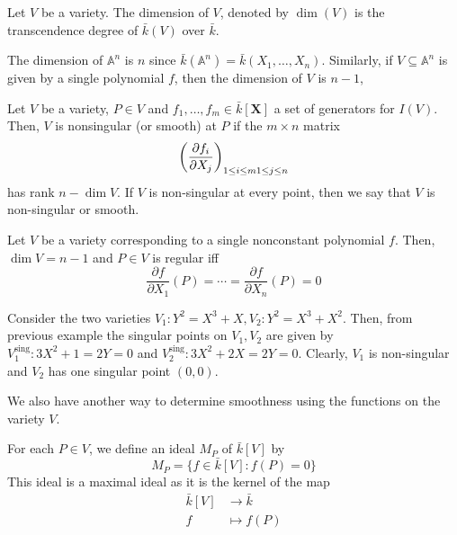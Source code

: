 \documentclass[oneside, 12pt]{scrbook}
\newcommand{\Aa}{\mathbb{A}}
\theoremstyle{theorem}
\begin{document}
\begin{definition}
Let $V$ be a variety. The dimension of $V$, denoted by $\dim (V)$ is the transcendence degree of $\bar{k}(V)$ over $\bar{k}$.
\end{definition}

\begin{example}
The dimension of $\Aa^n$ is $n$ since $\bar{k}(\Aa^n) = \bar{k}(X_{1},\hdots , X_{n})$. Similarly, if $V \subseteq \Aa^n$ is given by a single polynomial $f$, then the dimension of $V$ is $n-1$,
\end{example}

\begin{definition}
Let $V$ be a variety, $P \in V$ and $f_{1}, \hdots , f_{m} \in \bar{k}[\mathbf{X}]$ a set of generators for $I(V)$. Then, $V$ is nonsingular (or smooth) at $P$ if the $m \times n$ matrix $$\left( \frac{\partial f_{i}}{\partial X_{j}} \right)_{1 \le i \le m \\ 1 \le j \le n}$$ has rank $n-\dim V$. If $V$ is non-singular at every point, then we say that $V$ is non-singular or smooth.
\end{definition}

\begin{example}
Let $V$ be a variety corresponding to a single nonconstant polynomial $f$. Then, $\dim V =n-1$ and $P \in V$ is regular iff 
\begin{equation}
\frac{\partial f}{\partial X_{1}}(P) = \cdots = \frac{\partial f}{\partial X_{n}}(P) = 0
\end{equation}
\end{example}

\begin{example}
Consider the two varieties $V_{1}: Y^2 = X^3 + X , V_{2}: Y^2 = X^3 + X^2$. Then, from previous example the singular points on $V_{1},V_{2}$ are given by $V_{1}^{\text{sing}}: 3X^2 + 1 = 2Y=0$ and $V_{2}^{\text{sing}}: 3X^2 + 2X = 2Y=0$. Clearly, $V_{1}$ is non-singular and $V_{2}$ has one singular point $(0,0)$.
\end{example}

We also have another way to determine smoothness using the functions on the variety $V$. 

\begin{definition}
For each $P \in V$, we define an ideal $M_{P}$ of $\bar{k}[V]$ by $$M_{P} = \{f \in \bar{k}[V]: f(P)=0\}$$ This ideal is a maximal ideal as it is the kernel of the map 
\begin{align*}
\bar{k}[V] &\rightarrow \bar{k} \\
f &\mapsto f(P)
\end{align*}
\end{definition}
\end{document}
